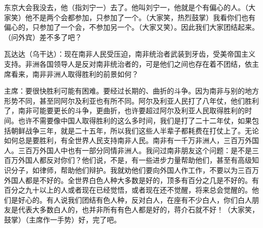 东京大会我没去，他（指刘宁一）去了。他叫刘宁一，他就是个有偏心的人。（大家笑）他不是两个会都参加，只参加了一个。（大家笑，热烈鼓掌）我看你们也有偏心的，只参加了一个会，不参加另一个。（大家又笑）。因此我们大家团结起来。（问外宾）差不多了吧？

瓦达达（乌干达）：现在南非人民受压迫，南非统治者武装到牙齿，受美帝国主义支持。非洲各国领导人是反对南非统治者的，可是他们之间也存在着不团结，依主席看来，南非非洲人取得胜利的前景如何？

主席：要很快胜利可能有困难。要经过长期的、曲折的斗争。因为南非与别的地方形势不同，甚至同阿尔及利亚也有所不同。阿尔及利亚人民打了八年仗，他们胜利了，南非可能要更长的斗争，更曲折，也许要超过阿尔及利亚人民取得胜利的时间。也许不需要像中国人取得胜利的这么多时间，我们是打了二十二年仗，如果包括朝鲜战争三年，就是二十五年，所以我们这些人半辈子都耗费在打仗上了。无论如何总是要胜利，有全世界人民支持南非人民。南非有一千万非洲人，三百万外国人。三百万外国人中也有一部分同情非洲人。我问过南非朋友这个问题：是不是三百万外国人都反对你们？他们说，不是，有一些进步力量帮助他们，甚至有高级知识分子，如律师，帮助他们辩护。我就劝他们要向外国人作工作，不要以为三百万外国人都是不好的。全世界白色人种大多数是好的，顶多有百分之几是不好的。有百分之九十以上的人或者现在已经觉悟，或者现在还不觉醒，将来总会觉醒的。他们是好心的。有人说我们团结有色人种，反对白人，在座有不少白人，你们白人朋友是代表大多数白人的，也并非所有有色人都是好的，蒋介石就不好！（大家笑，鼓掌）（主席作一手势）好，完了吧。



